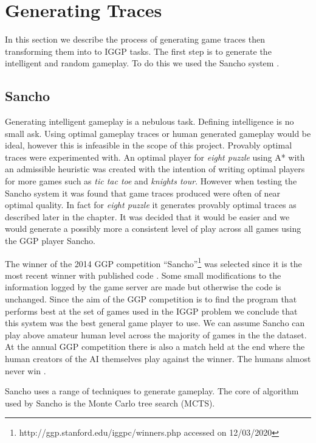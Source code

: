 \chapter{Generating Traces}\label{ch:traces}
In this section we describe the process of generating game traces then transforming them into to IGGP tasks. The first step is to generate the intelligent and random gameplay. To do this we used the Sancho system \cite{Sancho/Github}.

\section{Sancho}\label{sec:sancho}
Generating intelligent gameplay is a nebulous task. Defining intelligence is no small ask. Using optimal gameplay traces or human generated gameplay would be ideal, however this is infeasible in the scope of this project. Provably optimal traces were experimented with. An optimal player for \textit{eight puzzle} using A* with an admissible heuristic was created with the intention of writing optimal players for more games such as \textit{tic tac toe} and \textit{knights tour}. However when testing the Sancho system it was found that game traces produced were often of near optimal quality. In fact for \textit{eight puzzle} it generates provably optimal traces as described later in the chapter. It was decided that it would be easier and we would generate a possibly more a consistent level of play across all games using the GGP player Sancho.

The winner of the 2014 GGP competition ``Sancho''\footnote{http://ggp.stanford.edu/iggpc/winners.php accessed on 12/03/2020} was selected since it is the most recent winner with published code \cite{Sancho/Github}. Some small modifications to the information logged by the game server are made but otherwise the code is unchanged. Since the aim of the GGP competition is to find the program that performs best at the set of games used in the IGGP problem we conclude that this system was the best general game player to use. We can assume Sancho can play above amateur human level across the majority of games in the the dataset. At the annual GGP competition there is also a match held at the end where the human creators of the AI themselves play against the winner. The humans almost never win \cite{Genesereth/GGPOverview}.

Sancho uses a range of techniques to generate gameplay. The core of algorithm used by Sancho is the Monte Carlo tree search (MCTS).

